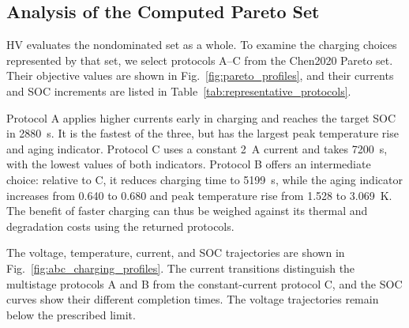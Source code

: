 \subsection{Analysis of the Computed Pareto Set}

HV evaluates the nondominated set as a whole. To examine the charging choices
represented by that set, we select protocols A--C from the Chen2020 Pareto
set. Their objective values are shown in Fig.~\ref{fig:pareto_profiles}, and
their currents and SOC increments are listed in
Table~\ref{tab:representative_protocols}.

Protocol A applies higher currents early in charging and reaches the target
SOC in 2880~s. It is the fastest of the three, but has the largest peak
temperature rise and aging indicator. Protocol C uses a constant 2~A current
and takes 7200~s, with the lowest values of both indicators. Protocol B offers
an intermediate choice: relative to C, it reduces charging time to 5199~s,
while the aging indicator increases from 0.640 to 0.680 and peak temperature
rise from 1.528 to 3.069~K. The benefit of faster charging can thus be weighed
against its thermal and degradation costs using the returned protocols.

The voltage, temperature, current, and SOC trajectories are shown in
Fig.~\ref{fig:abc_charging_profiles}. The current transitions distinguish the
multistage protocols A and B from the constant-current protocol C, and the SOC
curves show their different completion times. The voltage trajectories remain
below the prescribed limit.

